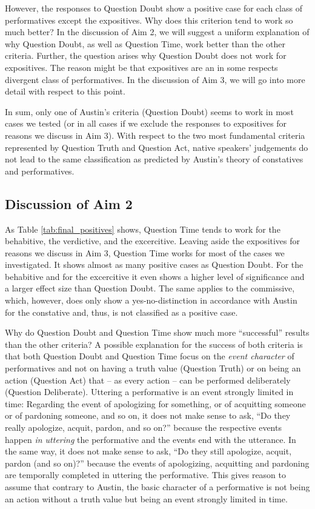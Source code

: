 \documentclass[egregdoesnotlikesansseriftitles,12pt]{scrartcl}
\begin{document}
However, the responses to Question Doubt show a positive case for each class of performatives except the expositives. Why does this criterion tend to work so much better? In the discussion of Aim 2, we will suggest a uniform explanation of why Question Doubt, as well as Question Time, work better than the other criteria. Further, the question arises why Question Doubt does not work for expositives. The reason might be that expositives are an in some respects divergent class of performatives. In the discussion of Aim 3, we will go into more detail with respect to this point.

In sum, only one of Austin's criteria (Question Doubt) seems to work in most cases we tested (or in all cases if we exclude the responses to expositives for reasons we discuss in Aim 3). With respect to the two most fundamental criteria represented by Question Truth and Question Act, native speakers' judgements do not lead to the same classification as predicted by Austin's theory of constatives and performatives.


\subsection{Discussion of Aim 2}
As Table \ref{tab:final_positives} shows, Question Time tends to work for the behabitive, the verdictive, and the excercitive. Leaving aside the expositives for reasons we discuss in Aim 3, Question Time works for most of the cases we investigated. It shows almost as many positive cases as Question Doubt. For the behabitive and for the excercitive it even shows a higher level of significance and a larger effect size than Question Doubt. The same applies to the commissive, which, however, does only show a yes-no-distinction in accordance with Austin for the constative and, thus, is not classified as a positive case.

Why do Question Doubt and Question Time show much more ``successful'' results than the other criteria? A possible explanation for the success of both criteria is that both Question Doubt and Question Time focus on the \textit{event character} of performatives and not on having a truth value (Question Truth) or on being an action (Question Act) that -- as every action -- can be performed deliberately (Question Deliberate). Uttering a performative is an event strongly limited in time: Regarding the event of apologizing for something, or of acquitting someone or of pardoning someone, and so on, it does not make sense to ask, ``Do they really apologize, acquit, pardon, and so on?'' because the respective events happen \textit{in uttering} the performative and the events end with the utterance. In the same way, it does not make sense to ask, ``Do they still apologize, acquit, pardon (and so on)?'' because the events of apologizing, acquitting and pardoning are temporally completed in uttering the performative. This gives reason to assume that contrary to Austin, the basic character of a performative is not being an action without a truth value but being an event strongly limited in time.
\end{document}
